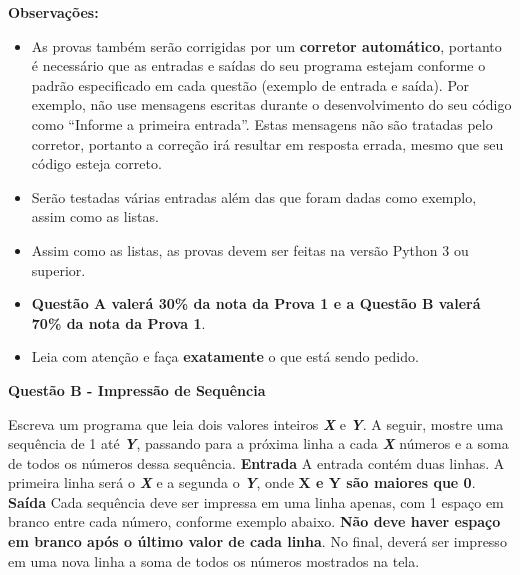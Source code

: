 \documentclass[a4paper, 12pt]{article}
\begin{document}
\textbf{{\large Observações:}}
\begin{itemize}
	\item As provas também serão corrigidas por um \textbf{corretor automático}, portanto é necessário que as entradas e saídas do seu programa estejam conforme o padrão especificado em cada questão (exemplo de entrada e saída). Por exemplo, não use mensagens escritas durante o desenvolvimento do seu código como “Informe a primeira entrada”. Estas mensagens não são tratadas pelo corretor, portanto a correção irá resultar em resposta errada, mesmo que seu código esteja correto.
	\item Serão testadas várias entradas além das que foram dadas como exemplo, assim como as listas.
	\item Assim como as listas, as provas devem ser feitas na versão Python 3 ou superior.
	\item \textbf{Questão A valerá 30\% da nota da Prova 1 e a Questão B valerá 70\% da nota da Prova 1}.
	\item Leia com atenção e faça \textbf{exatamente} o que está sendo pedido.
\end{itemize}
\newpage %
\begin{center}
\textbf{{\Large Questão B - Impressão de Sequência}}
\end{center}
\vspace{5pt}
Escreva um programa que leia dois valores inteiros \textbf{\textit{X}} e \textbf{\textit{Y}}. A seguir, mostre uma sequência de 1 até \textbf{\textit{Y}}, passando para a próxima linha a cada \textbf{\textit{X}} números e a soma de todos os números dessa sequência.
\newline \newline
\textbf{{\large Entrada}} \newline
A entrada contém duas linhas. A primeira linha será o \textbf{\textit{X}} e a segunda o \textbf{\textit{Y}}, onde \textbf{X e Y são maiores que 0}.
\newline \newline
\textbf{{\large Saída}} \newline
Cada sequência deve ser impressa em uma linha apenas, com 1 espaço em branco entre cada número, conforme exemplo abaixo. \textbf{Não deve haver espaço em branco após o último valor de cada linha}. No final, deverá ser impresso em uma nova linha a soma de todos os números mostrados na tela.
\newline
\end{document}
